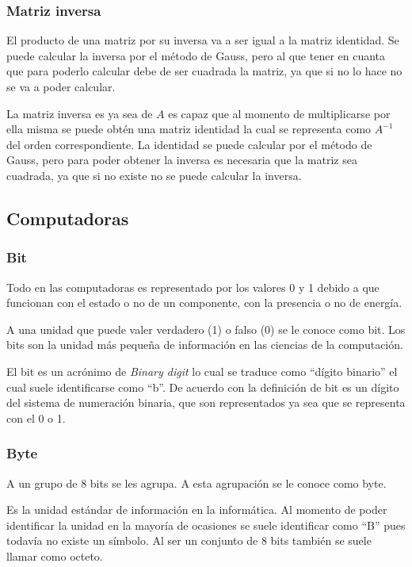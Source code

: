 \documentclass[a4paper]{article}
\begin{document}
\subsubsection{Matriz inversa}
El producto de una matriz por su inversa va a ser igual a la matriz identidad.
Se puede calcular la inversa por el método de Gauss, pero al que tener en
cuanta que para poderlo calcular debe de ser cuadrada la matriz, ya que si no
lo hace no se va a poder calcular.

La matriz inversa es ya sea de $A$ es capaz que al momento de multiplicarse por
ella misma se puede obtén una matriz identidad la cual se representa como
$A^{-1}$ del orden correspondiente.
La identidad se puede calcular por el método de Gauss, pero para poder obtener
la inversa es necesaria que la matriz sea cuadrada, ya que si no existe no se
puede calcular la inversa.

\subsection{Computadoras}

\subsubsection{Bit}
Todo en las computadoras es representado por los valores 0 y 1 debido a que
funcionan con el estado o no de un componente, con la presencia o no de
energía.

A una unidad que puede valer verdadero (1) o falso (0) se le conoce como bit.
Los bits son la unidad más pequeña de información en las ciencias de la
computación.

El bit es un acrónimo de \textit{Binary digit} lo cual se traduce como “dígito
binario” el cual suele identificarse como “b”. De acuerdo con la definición de
bit es un dígito del sistema de numeración binaria, que son representados ya
sea que se representa con el 0 o 1.

\autocite{BIT}

\subsubsection{Byte}
A un grupo de 8 bits se les agrupa. A esta agrupación se le conoce como byte.

Es la unidad estándar de información en la informática. Al momento de poder
identificar la unidad en la mayoría de ocasiones se suele identificar como “B”
pues todavía no existe un símbolo. Al ser un conjunto de 8 bits también se
suele llamar como octeto.
\end{document}
